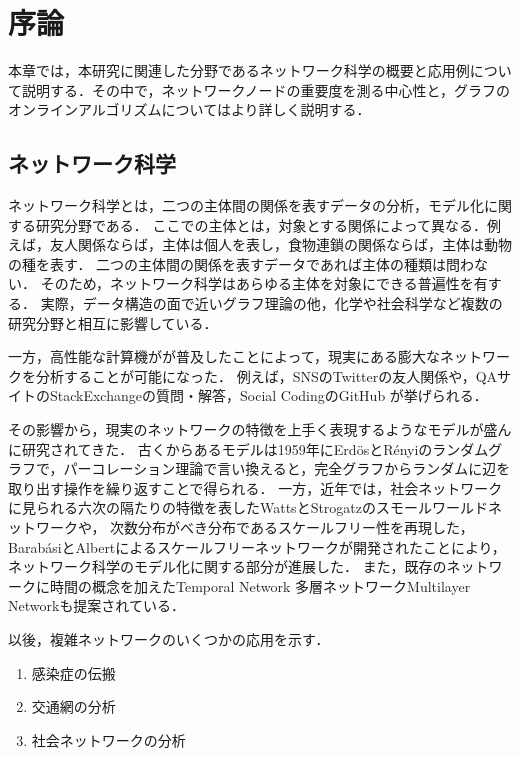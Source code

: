 \chapter{序論}
\label{chap:introduction}

本章では，本研究に関連した分野であるネットワーク科学の概要と応用例について説明する．その中で，ネットワークノードの重要度を測る中心性と，グラフのオンラインアルゴリズムについてはより詳しく説明する．

\section{ネットワーク科学}
\label{sect:network-science}

ネットワーク科学とは，二つの主体間の関係を表すデータの分析，モデル化に関する研究分野である．
ここでの主体とは，対象とする関係によって異なる．例えば，友人関係ならば，主体は個人を表し，食物連鎖の関係ならば，主体は動物の種を表す．
二つの主体間の関係を表すデータであれば主体の種類は問わない．
そのため，ネットワーク科学はあらゆる主体を対象にできる普遍性を有する．
実際，データ構造の面で近いグラフ理論の他，化学\cite{Sylvester1878}や社会科学\cite{Moreno1978}など複数の研究分野と相互に影響している．

一方，高性能な計算機がが普及したことによって，現実にある膨大なネットワークを分析することが可能になった．
例えば，SNSのTwitterの友人関係や，QAサイトのStackExchangeの質問・解答\cite{Movshovitz-Attias2013,Paranjape2017}，Social CodingのGitHub\cite{Lima2014}
が挙げられる．

その影響から，現実のネットワークの特徴を上手く表現するようなモデルが盛んに研究されてきた．
古くからあるモデルは1959年にErd{\"{o}}sとR{\'{e}}nyiのランダムグラフで，パーコレーション理論で言い換えると，完全グラフからランダムに辺を取り出す操作を繰り返すことで得られる．
一方，近年では，社会ネットワークに見られる六次の隔たり\cite{Travers1969}の特徴を表したWattsとStrogatz\cite{Watts1998}のスモールワールドネットワークや，
次数分布がべき分布であるスケールフリー性を再現した，Barab{\'{a}}siとAlbertによるスケールフリーネットワークが開発されたことにより，
ネットワーク科学のモデル化に関する部分が進展した．
また，既存のネットワークに時間の概念を加えたTemporal Network\cite{Holme2012}
多層ネットワークMultilayer Network\cite{Kivela2014}も提案されている．

以後，複雑ネットワークのいくつかの応用を示す．
\begin{enumerate}
\item 感染症の伝搬
\item 交通網の分析
\item 社会ネットワークの分析
\end{enumerate}

